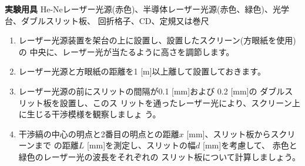 \newpage

\jikken

\begin{itemsquarebox}[c]{\bf 実験用具}
He-Neレーザー光源(赤色)、半導体レーザー光源(赤色、緑色)、光学台、ダブルスリット板、
回折格子、CD、定規又は巻尺
\end{itemsquarebox}

\bigskip


%
%
%
%
%


\begin{enumerate}

\item レーザー光源装置を架台の上に設置し、設置したスクリーン(方眼紙を使用)の
中央に、レーザー光が当たるように高さを調節します。

\item レーザー光源と方眼紙の距離を1 [m]以上離して設置しておきます。

\item レーザー光源の前にスリットの間隔が0.1 [mm]および
0.2 [mm]の ダブルスリット板を設置し、このス
リットを通ったレーザー光により、スクリーン上に生じる干渉模様を観察しましょ
う。

\item 干渉縞の中心の明点と2番目の明点との距離$x$ [mm]、スリット板からスクリーンまで
の距離$L$ [mm]を測定し、スリットの幅$d$ [mm]を考慮して、
赤色と緑色のレーザー光の波長をそれぞれの
スリット板について計算しましょう。


\end{enumerate}



\bigskip

